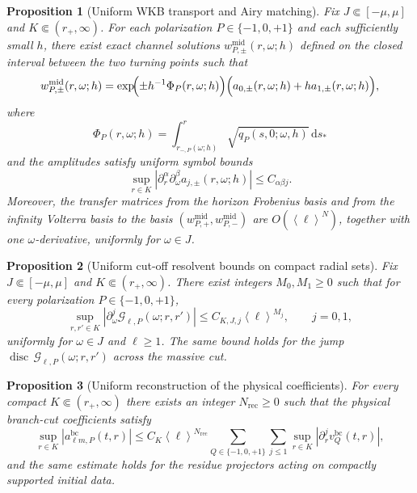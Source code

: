 \documentclass[10pt,a4paper]{amsart}
\newtheorem{proposition}{Proposition}
\newcommand{\abs}[1]{\left|#1\right|}
\newcommand{\angles}[1]{\left\langle #1 \right\rangle}
\newcommand{\bc}{\mathrm{bc}}
\newcommand{\cG}{\mathcal G}
\newcommand{\dd}{\mathrm d}
\newcommand{\disc}{\operatorname{disc}}
\newcommand{\om}{\omega}
\begin{document}
\begin{proposition}[Uniform WKB transport and Airy matching]\label{prop:largeell_wkb_matching}
Fix $J\Subset[-\mu,\mu]$ and $K\Subset(r_+,\infty)$.  For each polarization $P\in\{-1,0,+1\}$ and each sufficiently small $h$, there exist exact channel solutions $w_{P,\pm}^{\mathrm{mid}}(r,\om;h)$ defined on the closed interval between the two turning points such that
\[
   w_{P,\pm}^{\mathrm{mid}}(r,\om;h)
   =
   \exp\!\Bigl(\pm h^{-1}\Phi_P(r,\om;h)\Bigr)
   \Bigl(a_{0,\pm}(r,\om;h)+h a_{1,\pm}(r,\om;h)\Bigr),
\]
where
\[
   \Phi_P(r,\om;h)=\int_{r_{-,P}(\om;h)}^{r}\sqrt{q_P(s,0;\om,h)}\,\dd s_*
\]
and the amplitudes satisfy uniform symbol bounds
\[
   \sup_{r\in K}\abs{\partial_r^\alpha\partial_\omega^\beta a_{j,\pm}(r,\om;h)}\le C_{\alpha\beta j}.
\]
Moreover, the transfer matrices from the horizon Frobenius basis and from the infinity Volterra basis to the basis $(w_{P,+}^{\mathrm{mid}},w_{P,-}^{\mathrm{mid}})$ are $O(\angles{\ell}^{N})$, together with one $\omega$-derivative, uniformly for $\om\in J$.
\end{proposition}

\begin{proposition}[Uniform cut-off resolvent bounds on compact radial sets]\label{prop:largeell_uniform_resolvent}
Fix $J\Subset[-\mu,\mu]$ and $K\Subset(r_+,\infty)$.  There exist integers $M_0,M_1\ge0$ such that for every polarization $P\in\{-1,0,+1\}$,
\[
   \sup_{r,r'\in K}\abs{\partial_\omega^j\cG_{\ell,P}(\om;r,r')}
   \le
   C_{K,J,j}\angles{\ell}^{M_j},
   \qquad j=0,1,
\]
uniformly for $\om\in J$ and $\ell\ge1$.  The same bound holds for the jump $\disc\,\cG_{\ell,P}(\om;r,r')$ across the massive cut.
\end{proposition}

\begin{proposition}[Uniform reconstruction of the physical coefficients]\label{prop:largeell_reconstruction}
For every compact $K\Subset(r_+,\infty)$ there exists an integer $N_{\mathrm{rec}}\ge0$ such that the physical branch-cut coefficients satisfy
\[
   \sup_{r\in K}\abs{a^{\bc}_{\ell m,P}(t,r)}
   \le
   C_K\angles{\ell}^{N_{\mathrm{rec}}}
   \sum_{Q\in\{-1,0,+1\}}\sum_{j\le1}
   \sup_{r\in K}\abs{\partial_r^j v_Q^{\bc}(t,r)},
\]
and the same estimate holds for the residue projectors acting on compactly supported initial data.
\end{proposition}
\end{document}
